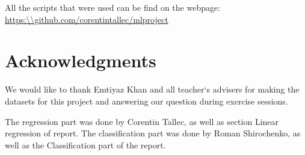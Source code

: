 \documentclass{article} %
\begin{document}
All the scripts that were used can be find on the webpage:
\url{https:\\github.com/corentintallec/mlproject}

\section{Acknowledgments}
We would like to thank Emtiyaz Khan and all teacher`s advisers for making the datasets for this project and answering our question during exercise sessions.

The regression part was done by Corentin Tallec, as well as section Linear regression of report. The classification part was done by Roman Shirochenko, as well as the Classification part of the report.
\end{document}
